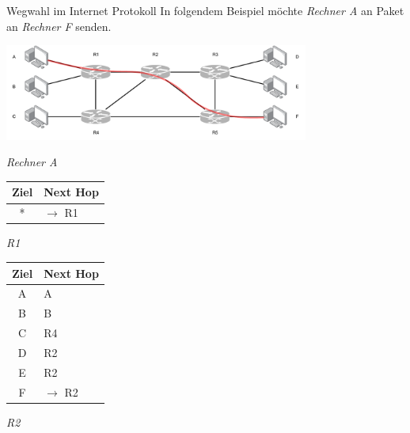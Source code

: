 \begin{example}{Wegwahl im Internet Protokoll}
    In folgendem Beispiel möchte \emph{Rechner A} an Paket an \emph{Rechner F} senden.
    
    \begin{center}
        \includegraphics[width=0.75\textwidth]{includes/figures/example_ip_routing.pdf }
    \end{center}
    
    \begin{minipage}{0.25\textwidth}
        \begin{center}
            \emph{Rechner A}
            
            \begin{tabular}{|c|l|}
                \hline
                Ziel & Next Hop \\\hline\hline
                *    & $\to$ R1 \\\hline
            \end{tabular}
        \end{center}
    \end{minipage}
    \begin{minipage}{0.25\textwidth}
        \begin{center}
            \emph{R1}
            
            \begin{tabular}{|c|l|}
                \hline
                Ziel & Next Hop \\\hline\hline
                A    & A        \\
                B    & B        \\
                C    & R4       \\
                D    & R2       \\
                E    & R2       \\
                F    & $\to$ R2 \\\hline
            \end{tabular}
        \end{center}
    \end{minipage}
    \begin{minipage}{0.25\textwidth}
        \begin{center}
            \emph{R2}
            

\end{center}
\end{minipage}
\end{example}
